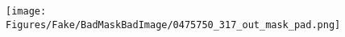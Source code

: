 \documentclass[runningheads]{llncs}
\begin{document}
\begin{figure}[tb]
\texttt{[image: Figures/Fake/BadMaskBadImage/0475750\_317\_out\_mask\_pad.png]} \\%
\end{figure}
\end{document}

